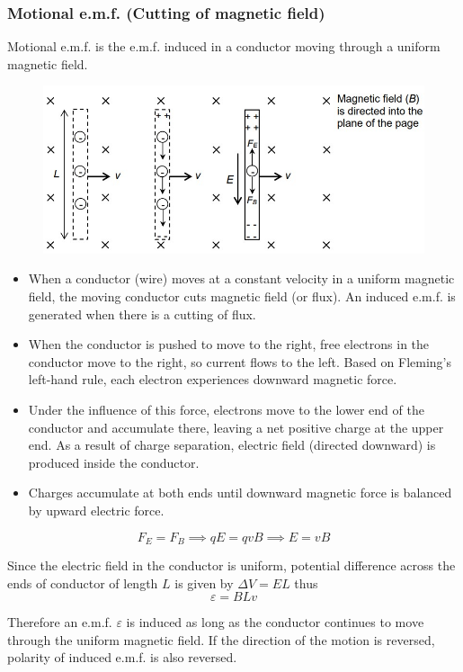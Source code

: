 \subsubsection{Motional e.m.f. (Cutting of magnetic field)}
Motional e.m.f. is the e.m.f. induced in a conductor moving through a uniform magnetic field.

\begin{figure}[H]
    \centering
    \includegraphics[width=12cm]{images/motional_emf.jpg}
\end{figure}

\begin{itemize}
\item When a conductor (wire) moves at a constant velocity in a uniform magnetic field, the moving conductor cuts magnetic field (or flux). An induced e.m.f. is generated when there is a cutting of flux. 
\item When the conductor is pushed to move to the right, free electrons in the conductor move to the right, so current flows to the left. Based on Fleming’s left-hand rule, each electron experiences downward magnetic force. 
\item Under the influence of this force, electrons move to the lower end of the conductor and accumulate there, leaving a net positive charge at the upper end. As a result of charge separation, electric field (directed downward) is produced inside the conductor. 
\item Charges accumulate at both ends until downward magnetic force is balanced by upward electric force.
\end{itemize}
\[ F_E = F_B \implies qE = qvB \implies E = vB \]

Since the electric field in the conductor is uniform, potential difference across the ends of conductor of length $L$ is given by $\Delta V=EL$ thus
\begin{equation}
\varepsilon = BLv
\end{equation}

Therefore an e.m.f. $\varepsilon$ is induced as long as the conductor continues to move through the uniform magnetic field. If the direction of the motion is reversed, polarity of induced e.m.f. is also reversed.


